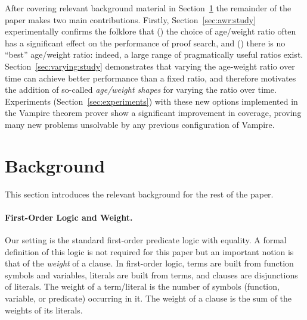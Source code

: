 \documentclass{llncs}
\begin{document}
After covering relevant background material in Section~\ref{sec:background} the remainder of the paper makes two main contributions.
Firstly, Section~\ref{sec:awr:study} experimentally confirms the folklore that () the choice of age/weight ratio often has a significant effect on the performance of proof search, and () there is no ``best'' age/weight ratio: indeed, a large range of pragmatically useful ratios exist.
Section~\ref{sec:varying:study} demonstrates that varying the age-weight ratio over time can achieve better performance than a fixed ratio, and therefore motivates the addition of so-called \emph{age/weight shapes} for varying the ratio over time.
Experiments (Section~\ref{sec:experiments}) with these new options implemented in the Vampire theorem prover show a significant improvement in coverage, proving many new problems unsolvable by any previous configuration of Vampire.

\section{Background}
\label{sec:background}
This section introduces the relevant background for the rest of the paper.

\paragraph{First-Order Logic and Weight.}
Our setting is the standard first-order predicate logic with equality. A formal definition of this logic is not required for this paper but an important notion is that of the \emph{weight} of a clause. In first-order logic,  terms are built from function symbols and variables, literals are built from terms, and clauses are disjunctions of literals.
The weight of a term/literal is the number of symbols (function, variable, or predicate) occurring in it.
The weight of a clause is the sum of the weights of its literals.
\end{document}
